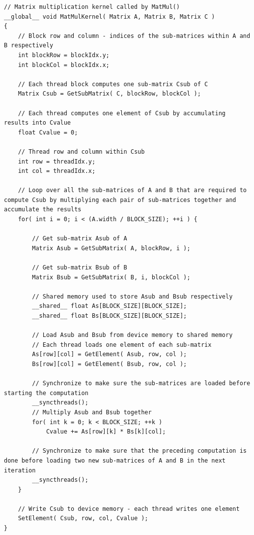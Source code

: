 \begin{lstlisting}[caption={Definition of the matrix multiplication kernel that uses both global memory with shared memory. The \code{GetSubMatrix(mtx, row, col)} is a function returns a \code{BLOCK\_SIZE x BLOCK\_SIZE} sub-matrix of a matrix that is located \code{col} sub-matrices to the right and \code{row} sub-matrices down from the upper-left corner of a the specified \code{Matrix}. The \code{GetElement(sub\_mtx, row, col, val)} function returns the element found at a matrices \code{row} and \code{col} indices. Taken from Nvidia's \emph{CUDA C++ Programming Guide} \cite{NVIDIAMay2022}.},label={Listing:CUDA-matrix-multiplication-with-shared-memory-example}]
// Matrix multiplication kernel called by MatMul()
__global__ void MatMulKernel( Matrix A, Matrix B, Matrix C )
{
	// Block row and column - indices of the sub-matrices within A and B respectively
	int blockRow = blockIdx.y;
	int blockCol = blockIdx.x;
	
	// Each thread block computes one sub-matrix Csub of C
	Matrix Csub = GetSubMatrix( C, blockRow, blockCol );
	
	// Each thread computes one element of Csub by accumulating results into Cvalue
	float Cvalue = 0;
	
	// Thread row and column within Csub
	int row = threadIdx.y;
	int col = threadIdx.x;
	
	// Loop over all the sub-matrices of A and B that are required to compute Csub by multiplying each pair of sub-matrices together and accumulate the results
	for( int i = 0; i < (A.width / BLOCK_SIZE); ++i ) {
		
		// Get sub-matrix Asub of A
		Matrix Asub = GetSubMatrix( A, blockRow, i );
		
		// Get sub-matrix Bsub of B
		Matrix Bsub = GetSubMatrix( B, i, blockCol );
		
		// Shared memory used to store Asub and Bsub respectively
		__shared__ float As[BLOCK_SIZE][BLOCK_SIZE];
		__shared__ float Bs[BLOCK_SIZE][BLOCK_SIZE];
		
		// Load Asub and Bsub from device memory to shared memory
		// Each thread loads one element of each sub-matrix
		As[row][col] = GetElement( Asub, row, col );
		Bs[row][col] = GetElement( Bsub, row, col );
		
		// Synchronize to make sure the sub-matrices are loaded before starting the computation
		__syncthreads();
		// Multiply Asub and Bsub together
		for( int k = 0; k < BLOCK_SIZE; ++k )
			Cvalue += As[row][k] * Bs[k][col];
		
		// Synchronize to make sure that the preceding computation is done before loading two new sub-matrices of A and B in the next iteration
		__syncthreads();
	}
	
	// Write Csub to device memory - each thread writes one element
	SetElement( Csub, row, col, Cvalue );
}
\end{lstlisting}

